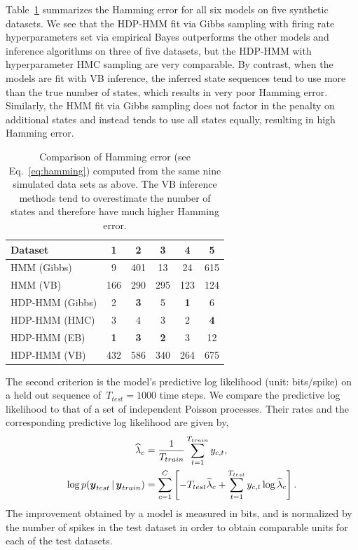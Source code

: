 Table~\ref{tab:synth_hamming} summarizes the Hamming error for all six
models on five synthetic datasets. We see that the HDP-HMM fit via
Gibbs sampling with firing rate hyperparameters set via empirical
Bayes outperforms the other models and inference algorithms on three
of five datasets, but the HDP-HMM with hyperparameter HMC sampling are
very comparable. By contrast, when the models are fit with VB
inference, the inferred state sequences tend to use more than the true
number of states, which results in very poor Hamming error. Similarly,
the HMM fit via Gibbs sampling does not factor in the penalty on
additional states and instead tends to use all states equally,
resulting in high Hamming error.

\begin{table}
  \centering
  \caption[Comparison of Hamming error on synthetic data]{Comparison
    of Hamming error (see Eq.~\ref{eq:hamming}) computed from the same
    nine simulated data sets as above. The VB inference methods tend
    to overestimate the number of states and therefore have much
    higher Hamming error.}
  \begin{tabular}{l|ccccc}
    Dataset & 1 & 2 & 3 & 4 & 5 \\
    \hline
    HMM (Gibbs) & 9 & 401 & 13 & 24 & 615 \\
    HMM (VB) & 166 & 290 & 295 & 123 & 124 \\
    HDP-HMM (Gibbs) & 2 & \bf{3} & 5 & \bf{1} & 6 \\
    HDP-HMM (HMC) & 3 & 4 & 3 & 2 & \bf{4} \\
    HDP-HMM (EB) & \bf{1} & \bf{3} & \bf{2} & 3 & 12 \\ 
    HDP-HMM (VB) & 432 & 586 & 340 & 264 & 675 \\
    \hline
  \end{tabular}
  \label{tab:synth_hamming}
\end{table}

The second criterion is the model's predictive log likelihood (unit:
bits/spike) on a held out sequence of~${T_{test}=1000}$ time steps. We
compare the predictive log likelihood to that of a set of independent
Poisson processes. Their rates and the corresponding predictive log
likelihood are given by,
\begin{align}
\widehat{\lambda}_c&=\frac{1}{T_{train}}\sum_{t=1}^{T_{train}} y_{c,t}, \\
\log p(\boldsymbol{y}_{test} \,|\, \boldsymbol{y}_{train}) &= \sum_{c=1}^C \left[ -T_{test} \widehat{\lambda}_c + \sum_{t=1}^{T_{test}} y_{c,t} \log \widehat{\lambda}_c  \right].
\end{align}
The improvement obtained by a model is measured in bits, and is
normalized by the number of spikes in the test dataset in order to
obtain comparable units for each of the test datasets.

